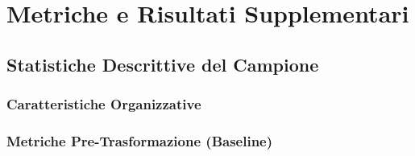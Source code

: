 \chapter{\texorpdfstring{Metriche e Risultati Supplementari}{Appendice B - Metriche e Risultati Supplementari}}
\label{app:metriche}

\section{\texorpdfstring{Statistiche Descrittive del Campione}{B.1 - Statistiche Descrittive del Campione}}

\subsection{\texorpdfstring{Caratteristiche Organizzative}{B.1.1 - Caratteristiche Organizzative}}

\begin{table}[htbp]
\centering
\caption{Statistiche descrittive delle organizzazioni partecipanti}
\label{tab:stats_descrittive}
\end{table}

\subsection{\texorpdfstring{Metriche Pre-Trasformazione (Baseline)}{B.1.2 - Metriche Pre-Trasformazione (Baseline)}}

